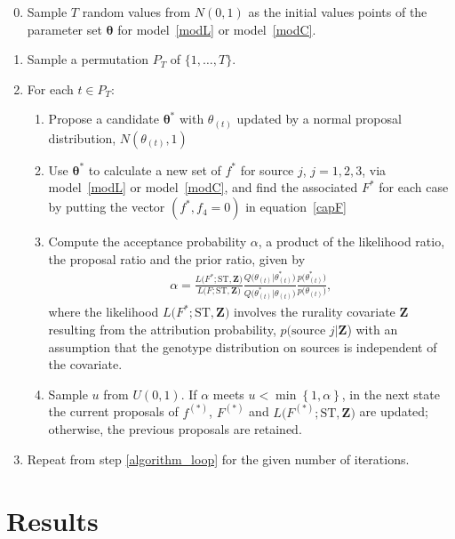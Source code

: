 \documentclass[times, doublespace]{simauth}%
\begin{document}
\begin{enumerate}
\setcounter{enumi}{-1}
\item Sample $T$ random values from $N(0,1)$ as the initial values points of the parameter set $\boldsymbol{\theta}$ for model~\eqref{modL} or model~\eqref{modC}.
\item Sample a permutation $P_T$ of $\{1, \ldots, T\}$.\label{algorithm_loop}
\item For each $t \in P_T$:
\begin{enumerate}
\item Propose a candidate $\boldsymbol{\theta}^*$ with $\theta_{(t)}$ updated by a normal proposal distribution, $N(\theta_{(t)}, 1)$

\item Use $\boldsymbol{\theta}^*$ to calculate a new set of $f^*$ for source $j$, $j=1, 2, 3$, via model~\eqref{modL} or model~\eqref{modC}, and find the associated $F^*$ for each case by putting the vector $(f^*, f_4=0)$ in equation~\eqref{capF}

\item Compute the acceptance probability $\alpha$, a product of the likelihood ratio, the proposal ratio and the prior ratio, given by
\begin{align*}
\alpha=\frac{L\Big(F^*; \text{ST}, \boldsymbol{Z}\Big)}{L\Big(F; \text{ST}, \boldsymbol{Z}\Big)}\frac{Q\Big(\theta_{(t)} \vert \theta_{(t)}^*\Big)}{Q\Big(\theta_{(t)}^* \vert \theta_{(t)}\Big)}\frac{p\Big(\theta_{(t)}^*\Big)}{p\Big(\theta_{(t)}\Big)},
\end{align*}
where the likelihood $L\Big(F^*; \text{ST}, \boldsymbol{Z}\Big)$ involves the rurality covariate $\boldsymbol{Z}$ resulting from the attribution probability, $p(\text{source }j\vert \boldsymbol{Z}$) with an assumption that the genotype distribution on sources is independent of the covariate.
\item Sample $u$ from $U(0,1)$. If $\alpha$ meets $u < \min \left\{1, \alpha \right\}$, in the next state the current proposals of $f^{(*)}$, $F^{(*)}$ and $L\Big(F^{(*)}; \text{ST}, \boldsymbol{Z}\Big)$ are updated; otherwise, the previous proposals are retained.
\end{enumerate}
\item Repeat from step \ref{algorithm_loop} for the given number of iterations.

\end{enumerate}

\section{Results}
\end{document}
